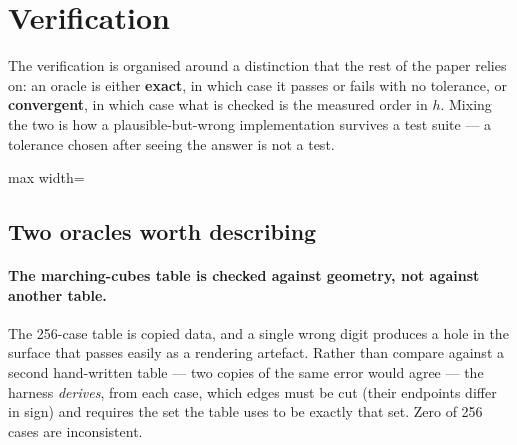 \section{Verification}
\label{sec:verification}


The verification is organised around a distinction that the rest of the paper
relies on: an oracle is either \textbf{exact}, in which case it passes or fails
with no tolerance, or \textbf{convergent}, in which case what is checked is the
measured order in $h$. Mixing the two is how a plausible-but-wrong
implementation survives a test suite --- a tolerance chosen after seeing the
answer is not a test.

\begin{table}[htbp]
\centering
\caption{Verification oracles. Exact oracles admit no tolerance; convergent
ones are checked by measured order.}
\label{tab:oracles}
\small
\begin{adjustbox}{max width=\linewidth}
\end{adjustbox}
\end{table}

\subsection{Two oracles worth describing}

\paragraph{The marching-cubes table is checked against geometry, not against
another table.}
The 256-case table is copied data, and a single wrong digit produces a hole in
the surface that passes easily as a rendering artefact. Rather than compare
against a second hand-written table --- two copies of the same error would agree
--- the harness \emph{derives}, from each case, which edges must be cut (their
endpoints differ in sign) and requires the set the table uses to be exactly that
set. Zero of 256 cases are inconsistent.

